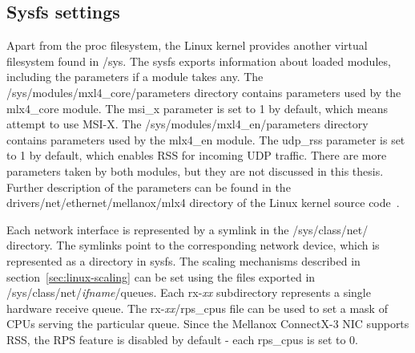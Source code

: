 
\subsection{Sysfs settings}\label{subsec:analysis-settings-sysfs}
Apart from the proc filesystem, the Linux kernel provides another virtual filesystem found in /sys.
The sysfs exports information about loaded modules, including the parameters if a module takes any.
The /sys/modules/mxl4\_core/parameters directory contains parameters used by the mlx4\_core module.
The msi\_x parameter is set to 1 by default, which means attempt to use MSI-X.
The /sys/modules/mxl4\_en/parameters directory contains parameters used by the mlx4\_en module.
The udp\_rss parameter is set to 1 by default, which enables RSS for incoming UDP traffic.
There are more parameters taken by both modules, but they are not discussed in this thesis.
Further description of the parameters can be found
in the drivers/net/ethernet/mellanox/mlx4 directory of the Linux kernel source code~\cite{kernel-source}.

Each network interface is represented by a symlink in the /sys/class/net/ directory.
The symlinks point to the corresponding network device, which is represented as a directory in sysfs.
The scaling mechanisms described in section~\ref{sec:linux-scaling} can be set
using the files exported in /sys/class/net/{\it{ifname}}/queues.
Each rx-{\it{xx}} subdirectory represents a single hardware receive queue.
The rx-{\it{xx}}/rps\_cpus file can be used to set a mask of CPUs serving the particular queue.
Since the Mellanox ConnectX-3 NIC supports RSS, the RPS feature is disabled by default - each rps\_cpus is set to 0.

